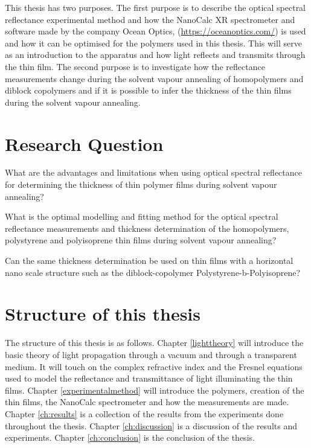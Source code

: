 \documentclass[MasterThesisMain.tex]{subfiles}
\begin{document}
This thesis has two purposes. The first purpose is to describe the optical spectral reflectance experimental method and how the NanoCalc XR spectrometer and software made by the company Ocean Optics, (\url{https://oceanoptics.com/}) is used and how it can be optimised for the polymers used in this thesis. This will serve as an introduction to the apparatus and how light reflects and transmits through the thin film. The second purpose is to investigate how the reflectance measurements change during the solvent vapour annealing of homopolymers and diblock copolymers and if it is possible to infer the thickness of the thin films during the solvent vapour annealing. 

\section{Research Question}
What are the advantages and limitations when using optical spectral reflectance for determining the thickness of thin polymer films during solvent vapour annealing?

What is the optimal modelling and fitting method for the optical spectral reflectance measurements and thickness determination of the homopolymers, polystyrene and polyisoprene thin films during solvent vapour annealing?  
		
Can the same thickness determination be used on thin films with a horizontal nano scale structure such as the diblock-copolymer Polystyrene-b-Polyisoprene?

\section{Structure of this thesis} 
The structure of this thesis is as follows. Chapter \ref{lighttheory} will introduce the basic theory of light propagation through a vacuum and through a transparent medium. It will touch on the complex refractive index and the Fresnel equations used to model the reflectance and transmittance of light illuminating the thin films. Chapter \ref{experimentalmethod} will introduce the polymers, creation of the thin films, the NanoCalc spectrometer and how the measurements are made.  Chapter \ref{ch:results} is a collection of the results from the experiments done throughout the thesis. Chapter \ref{ch:discussion} is a discussion of the results and experiments. Chapter \ref{ch:conclusion} is the conclusion of the thesis.

        
\end{document}
